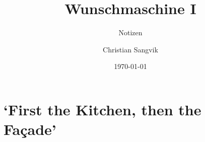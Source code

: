 \documentclass[a4paper,11pt,ngerman]{scrartcl}
\subtitle{Notizen}
\author{Christian Sangvik}
\date{\today}
\title{Wunschmaschine I}
\begin{document}
\maketitle
\tableofcontents


\section{`First the Kitchen, then the Façade'}
\label{sec-1}



\cite{bullock-1988-kitch-then-facad}



\end{document}
